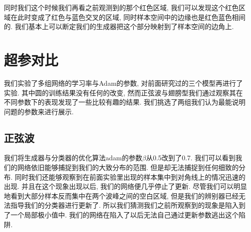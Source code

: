 \documentclass[lang=cn,11pt]{elegantpaper}
\begin{document}
同时我们这个时候我们再看之前观测到的那个红色区域, 我们可以发现这个红色区域在此时变成了红色与蓝色交叉的区域, 同时样本空间中的边缘也是红色蓝色相间的. 我们基本上可以断定我们的生成器把这个部分映射到了样本空间的边角上.

\section{超参对比}

我们实验了多组网络的学习率与Adam的参数, 对前面研究过的三个模型再进行了实验. 其中圆的训练结果没有任何的改变, 然而正弦波与翅膀型我们通过观察其在不同参数下的表现发现了一些比较有趣的结果. 我们挑选了两组我们认为最能说明问题的参数来进行展示.

\subsection{正弦波}

我们将生成器与分类器的优化算法adam的参数$\beta$从0.5改到了0.7. 我们可以看到我们的网络依旧能够捕捉到我们的大致分布的范围. 但是却无法捕捉到任何细致的分布. 同时我们还能够观察到在前面实验里出现的样本集中到对角线上的情况迅速的出现. 并且在这个现象出现以后, 我们的网络便几乎停止了更新. 尽管我们可以明显地看到大部分样本反而集中在两个波峰之间的空白区域, 但是我们的辨别器已经无法指导我们的分类器进行更新了. 所以我们猜测我们之前所观察到的现象是陷入到了一个局部极小值中. 我们的网络在陷入了以后无法自己通过更新参数逃出这个陷阱.
\end{document}
